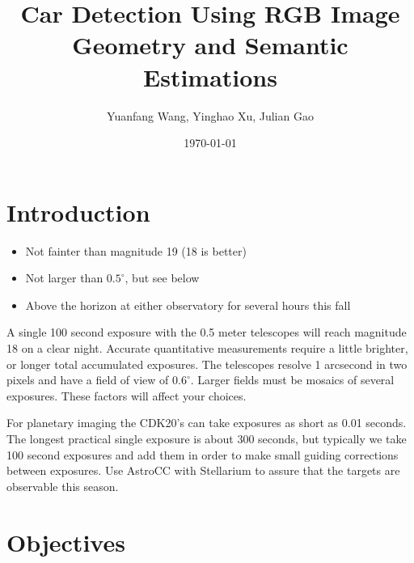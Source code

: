 \documentclass[dvips,12pt]{article}
\begin{document}
\title{Car Detection Using RGB Image Geometry and Semantic Estimations}
\author{Yuanfang Wang, Yinghao Xu, Julian Gao}
\date{\today}
\maketitle

\section{Introduction}
%
%

\begin{itemize}
\item Not fainter than magnitude 19 (18 is better)
\item Not larger than $0.5^\circ$, but see below
\item Above the horizon at either observatory for several hours this fall
\end{itemize}

A single 100 second exposure with the 0.5 meter telescopes will reach magnitude
18 on a clear night.  Accurate quantitative measurements require a little
brighter, or longer total accumulated exposures.  The telescopes resolve 1
arcsecond in two pixels and have a field of view of $0.6^\circ$.  Larger fields
must be mosaics of several exposures. These factors will affect your
choices.  

For planetary imaging the CDK20's can take exposures as short as 0.01 seconds. 
The longest practical single exposure is about 300 seconds, but typically we
take 100 second exposures and add them in order to make small guiding
corrections between exposures. Use AstroCC with Stellarium to assure that the
targets are observable this season.

\section{Objectives}
\end{document}
